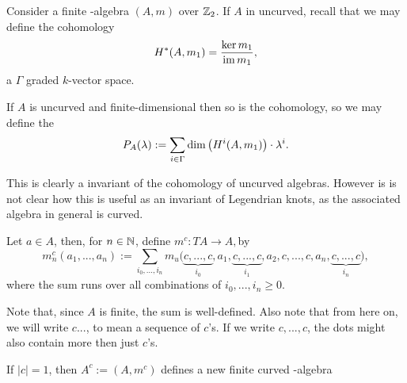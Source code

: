 

Consider a finite \Ainf-algebra $(A,m)$ over $\mathbb{Z}_2$. If $A$ in uncurved, recall that we may define the cohomology 
\[ H^*(A, m_1) = \frac{\operatorname{ker} m_1}{\operatorname{im} m_1}, \] 
a $\Gamma$ graded $k$-vector space. 

\begin{defn}
If $A$ is uncurved and finite-dimensional then so is the cohomology, so we may define the 
\[ P_A(\lambda) := \sum_{i \in \Gamma} \dim\qty( H^i(A,m_1) )\cdot \lambda^i. \]
\end{defn}

This is clearly a invariant of the cohomology of uncurved \Ainf algebras. However
is is not clear how this is useful as an invariant of Legendrian knots, as the
associated \Ainf algebra in general is curved.




\begin{defn}
Let $a \in A$, then, for $n \in \mathbb{N}$, define 
$ m^c: TA \to A, $by 
\begin{equation}
\label{eq:def_id_of_mc}
m^c_n(a_1,...,a_n) := \sum_{i_0,...,i_n}
m_u\big(\underbrace{c,...,c}_{i_0},a_1,\underbrace{c,...,c}_{i_1},a_2,c,...,c,a_n,\underbrace{c,...,c}_{i_n}\big), 
\end{equation}
where the sum runs over all combinations of $i_0,...,i_n \ge 0$.
\end{defn}

Note that, since $A$ is finite, the sum is well-defined.
Also note that from here on, we will write $c...$, to mean a sequence of $c$'s. If we write $c,...,c$, the dots might also contain more then
just $c$'s.

\begin{lemma}
\label{prop:Ac_is_ainf}
If $|c| = 1$, then $A^c := (A, m^c)$ defines a new finite curved \Ainf-algebra
\end{lemma}

